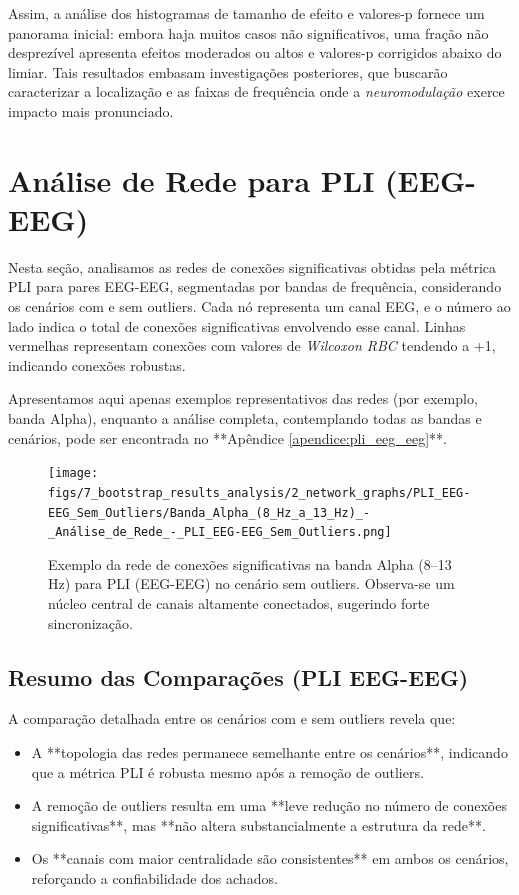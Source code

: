 Assim, a análise dos histogramas de tamanho de efeito e valores-p fornece um panorama inicial: embora haja muitos casos não significativos, uma fração não desprezível apresenta efeitos moderados ou altos e valores-p corrigidos abaixo do limiar. Tais resultados embasam investigações posteriores, que buscarão caracterizar a localização e as faixas de frequência onde a \emph{neuromodulação} exerce impacto mais pronunciado.


\section{Análise de Rede para PLI (EEG-EEG)}
\label{sec:rede_pli_eeg}

Nesta seção, analisamos as redes de conexões significativas obtidas pela métrica PLI para pares EEG-EEG, segmentadas por bandas de frequência, considerando os cenários com e sem outliers. Cada nó representa um canal EEG, e o número ao lado indica o total de conexões significativas envolvendo esse canal. Linhas vermelhas representam conexões com valores de \emph{Wilcoxon RBC} tendendo a +1, indicando conexões robustas.

Apresentamos aqui apenas exemplos representativos das redes (por exemplo, banda Alpha), enquanto a análise completa, contemplando todas as bandas e cenários, pode ser encontrada no **Apêndice \ref{apendice:pli_eeg_eeg}**.

\begin{figure}[htb]
  \centering
  \texttt{[image: figs/7\_bootstrap\_results\_analysis/2\_network\_graphs/PLI\_EEG-EEG\_Sem\_Outliers/Banda\_Alpha\_(8\_Hz\_a\_13\_Hz)\_-\_Análise\_de\_Rede\_-\_PLI\_EEG-EEG\_Sem\_Outliers.png]}
  \caption{Exemplo da rede de conexões significativas na banda Alpha (8--13\,Hz) para PLI (EEG-EEG) no cenário sem outliers. Observa-se um núcleo central de canais altamente conectados, sugerindo forte sincronização.}
  \label{fig:exemplo_rede_pli_alpha_sem}
\end{figure}

\subsection{Resumo das Comparações (PLI EEG-EEG)}

A comparação detalhada entre os cenários com e sem outliers revela que:

\begin{itemize}
    \item A **topologia das redes permanece semelhante entre os cenários**, indicando que a métrica PLI é robusta mesmo após a remoção de outliers.
    \item A remoção de outliers resulta em uma **leve redução no número de conexões significativas**, mas **não altera substancialmente a estrutura da rede**.
    \item Os **canais com maior centralidade são consistentes** em ambos os cenários, reforçando a confiabilidade dos achados.
\end{itemize}

